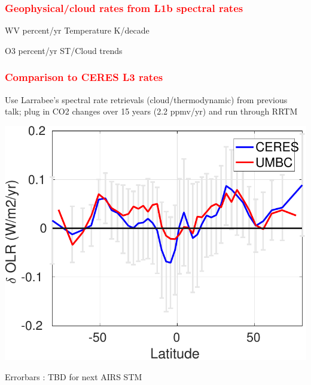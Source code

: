 \documentclass[10pt,t]{beamer}
\begin{document}
\begin{frame}
  \frametitle{\textcolor{red}{\bf Geophysical/cloud rates from L1b spectral rates}}
  \vspace{-0.1in}
  \hspace{0.50in} WV percent/yr \hspace{1.0in} Temperature K/decade \\
  \vspace{-0.1in}  
  \begin{center}
  \end{center}

  \vspace{-0.1in}
  \hspace{0.50in} O3 percent/yr \hspace{1.0in} ST/Cloud trends \\
  \vspace{-0.1in}  
  \begin{center}
  \end{center}

\end{frame}

\begin{frame}
  \frametitle{\textcolor{red}{\bf Comparison to CERES L3 rates}}
  Use Larrabee's spectral rate retrievals (cloud/thermodynamic) from previous talk;
  plug in CO2 changes over 15 years (2.2 ppmv/yr) and run through RRTM  
  \begin{center}
    \noindent\includegraphics[width=0.625\linewidth]{Figs/umbc_vs_ceres_fluxrates.pdf}
  \end{center}
 Errorbars : TBD for next AIRS STM
\end{frame}
\end{document}
